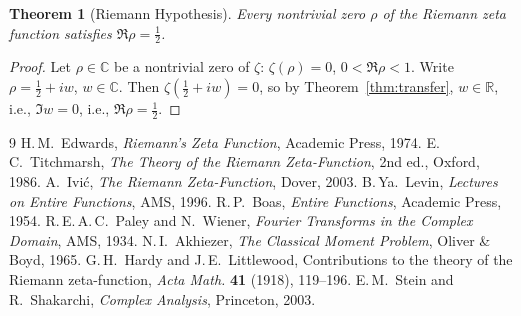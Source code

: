 \documentclass[11pt]{article}
\newtheorem{theorem}{Theorem}
\theoremstyle{definition}
\newcommand{\R}{\mathbb{R}}
\newcommand{\C}{\mathbb{C}}
\begin{document}
\begin{theorem}[Riemann Hypothesis]\label{thm:RH}
Every nontrivial zero \(\rho\) of the Riemann zeta function satisfies \(\Re\rho=\tfrac12\).
\end{theorem}

\begin{proof}
Let \(\rho\in\C\) be a nontrivial zero of \(\zeta\): \(\zeta(\rho)=0\), \(0<\Re\rho<1\). Write \(\rho=\tfrac12+iw\), \(w\in\C\). Then \(\zeta(\tfrac12+iw)=0\), so by Theorem~\ref{thm:transfer}, \(w\in\R\), i.e., \(\Im w=0\), i.e., \(\Re\rho=\tfrac12\).
\end{proof}

\begin{thebibliography}{9}
 H.\,M.\ Edwards, \emph{Riemann's Zeta Function}, Academic Press, 1974.
 E.\,C.\ Titchmarsh, \emph{The Theory of the Riemann Zeta-Function}, 2nd ed., Oxford, 1986.
 A.\ Ivi\'c, \emph{The Riemann Zeta-Function}, Dover, 2003.
 B.\,Ya.\ Levin, \emph{Lectures on Entire Functions}, AMS, 1996.
 R.\,P.\ Boas, \emph{Entire Functions}, Academic Press, 1954.
 R.\,E.\,A.\,C.\ Paley and N.\ Wiener, \emph{Fourier Transforms in the Complex Domain}, AMS, 1934.
 N.\,I.\ Akhiezer, \emph{The Classical Moment Problem}, Oliver \& Boyd, 1965.
 G.\,H.\ Hardy and J.\,E.\ Littlewood, Contributions to the theory of the Riemann zeta-function, \emph{Acta Math.} \textbf{41} (1918), 119--196.
 E.\,M.\ Stein and R.\ Shakarchi, \emph{Complex Analysis}, Princeton, 2003.
\end{thebibliography}
\end{document}

